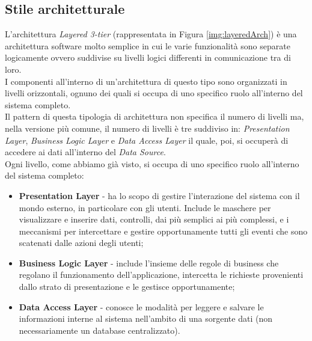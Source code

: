 \subsection{Stile architetturale}
L'architettura \textit{Layered 3-tier} (rappresentata in Figura \ref{img:layeredArch}) è una architettura software molto semplice in cui le varie funzionalità sono separate logicamente ovvero suddivise su livelli logici differenti in comunicazione tra di loro.\\
I componenti all'interno di un'architettura di questo tipo sono organizzati in livelli orizzontali, ognuno dei quali si occupa di uno specifico ruolo all'interno del sistema completo.\\
Il pattern di questa tipologia di architettura non specifica il numero di livelli ma, nella versione più comune, il numero di livelli è tre suddiviso in: \textit{Presentation Layer}, \textit{Business Logic Layer} e \textit{Data Access Layer} il quale, poi, si occuperà di accedere ai dati all'interno del \textit{Data Source}.\\
Ogni livello, come abbiamo già visto, si occupa di uno specifico ruolo all'interno del sistema completo:
\begin{itemize}
	\item \textbf{Presentation Layer} - ha lo scopo di gestire l'interazione del sistema con il mondo esterno, in particolare con gli utenti. Include le maschere per visualizzare e inserire dati, controlli, dai più semplici ai più complessi, e i meccanismi per intercettare e gestire opportunamente tutti gli eventi che sono scatenati dalle azioni degli utenti;
	\item \textbf{Business Logic Layer} - include l'insieme delle regole di business che regolano il funzionamento dell'applicazione, intercetta le richieste provenienti dallo strato di presentazione e le gestisce opportunamente;
	\item \textbf{Data Access Layer} - conosce le modalità per leggere e salvare le informazioni interne al sistema nell'ambito di una sorgente dati (non necessariamente un database centralizzato).
\end{itemize}
